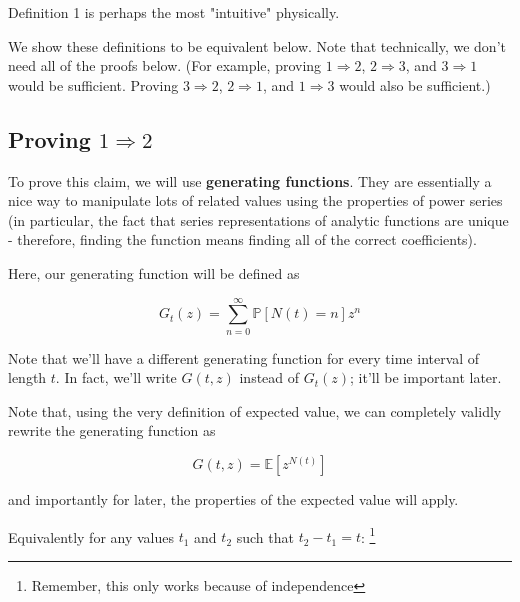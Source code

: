 \documentclass{article}
\begin{document}
Definition 1 is perhaps the most "intuitive" physically. 

We show these definitions to be equivalent below. Note that technically, we don't need all of the proofs below. (For example, proving $1 \Rightarrow 2$, $2 \Rightarrow 3$, and $3 \Rightarrow 1$ would be sufficient. Proving $3 \Rightarrow 2$, $2 \Rightarrow 1$, and $1 \Rightarrow 3$ would also be sufficient.) 


\subsection{Proving $1 \Rightarrow 2$}


To prove this claim, we will use \textbf{generating functions}. They are essentially a nice way to manipulate lots of related values using the properties of power series (in particular, the fact that series representations of analytic functions are unique - therefore, finding the function means finding all of the correct coefficients). 



Here, our generating function will be defined as 

\begin{equation}
G_t(z) = \sum_{n=0}^\infty \mathbb{P}[N(t) = n] z^n
\end{equation}

Note that we'll have a different generating function for every time interval of length $t$. In fact, we'll write $G(t, z)$ instead of $G_t(z)$; it'll be important later.

Note that, using the very definition of expected value, we can completely validly rewrite the generating function as 

\begin{equation}
G(t, z) = \mathbb{E}[z^{N(t)}]
\end{equation}

and importantly for later, the properties of the expected value will apply. 

Equivalently for any values $t_1$ and $t_2$ such that $t_2 - t_1 = t$: \footnote{Remember, this only works because of independence}
\end{document}
